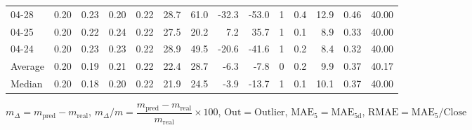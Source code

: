 \begin{threeparttable}
{\begin{tabular}{lrrrrrrrrrrrrr}
  04-28 &          0.20 &          0.23 &          0.20 &        0.22 &                28.7 &                61.0 &      -32.3 &        -53.0 &              1 &                 0.4 &             12.9 &            0.46 &                  40.00 \\
  04-25 &          0.20 &          0.22 &          0.24 &        0.22 &                27.5 &                20.2 &        7.2 &         35.7 &              1 &                 0.1 &              8.9 &            0.33 &                  40.00 \\
  04-24 &          0.20 &          0.23 &          0.23 &        0.22 &                28.9 &                49.5 &      -20.6 &        -41.6 &              1 &                 0.2 &              8.4 &            0.32 &                  40.00 \\
Average &          0.20 &          0.19 &          0.21 &        0.22 &                22.4 &                28.7 &       -6.3 &         -7.8 &              0 &                 0.2 &              9.9 &            0.37 &                  40.17 \\
 Median &          0.20 &          0.18 &          0.20 &        0.22 &                21.9 &                24.5 &       -3.9 &        -13.7 &              1 &                 0.1 &             10.1 &            0.37 &                  40.00 \\
\bottomrule
\end{tabular}
}
\begin{tablenotes}\footnotesize
\item $m_\Delta=m_{\text{pred}}-m_{\text{real}}$,
$m_\Delta/m=\dfrac{m_{\text{pred}}-m_{\text{real}}}{m_{\text{real}}}\times100$,
$\mathrm{Out}=\text{Outlier}$,
$\mathrm{MAE}_5=\mathrm{MAE}_{5\text{d}}$,
$\mathrm{RMAE}=\mathrm{MAE}_5/\text{Close}$
\end{tablenotes}
\end{threeparttable}
\endgroup

